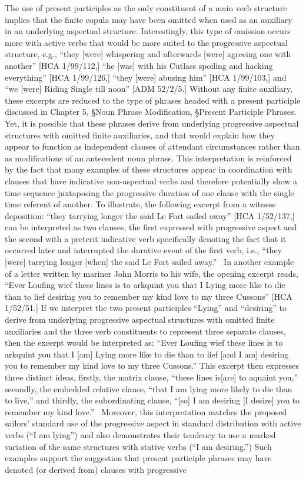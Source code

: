 \documentclass[12pt]{article}
\newenvironment{styleStandard}{\renewcommand\baselinestretch{1.0}\setlength\leftskip{0cm}\setlength\rightskip{0cm plus 1fil}\setlength\parindent{0cm}\setlength\parfillskip{0pt plus 1fil}\setlength\parskip{0in plus 1pt}\writerlistparindent\writerlistleftskip\leavevmode\normalfont\normalsize\writerlistlabel\ignorespaces}{\unskip\vspace{0in plus 1pt}\par}
\newcommand\writerlistleftskip{}
\newcommand\writerlistparindent{}
\newcommand\writerlistlabel{}
\begin{document}
\begin{styleStandard}
The use of present participles as the only constituent of a main verb structure implies that the finite copula may have been omitted when used as an auxiliary in an underlying aspectual structure. Interestingly, this type of omission occurs more with active verbs that would be more suited to the progressive aspectual structure, e.g., “they [were] whispering and afterwards [were] agreeing one with another” [HCA 1/99/112,] “he [was] with his Cutlass spoiling and hacking everything” [HCA 1/99/126,] “they [were] abusing him” [HCA 1/99/103,] and “we [were] Riding Single till noon” [ADM 52/2/5.] Without any finite auxiliary, these excerpts are reduced to the type of phrases headed with a present participle discussed in Chapter 5, §Noun Phrase Modification, §Present Participle Phrases. Yet, it is possible that these phrases derive from underlying progressive aspectual structures with omitted finite auxiliaries, and that would explain how they appear to function as independent clauses of attendant circumstances rather than as modifications of an antecedent noun phrase. This interpretation is reinforced by the fact that many examples of these structures appear in coordination with clauses that have indicative non-aspectual verbs and therefore potentially show a time sequence juxtaposing the progressive duration of one clause with the single time referent of another. To illustrate, the following excerpt from a witness deposition: “they tarrying longer the said Le Fort sailed away” [HCA 1/52/137,] can be interpreted as two clauses, the first expressed with progressive aspect and the second with a preterit indicative verb specifically denoting the fact that it occurred later and interrupted the durative event of the first verb, i.e., “they [were] tarrying longer [when] the said Le Fort sailed away.” \ In another example of a letter written by mariner John Morris to his wife, the opening excerpt reads, “Ever Loufing wief these lines is to arkquint you that I Lying more like to die than to lief desiring you to remember my kind love to my three Cussons” [HCA 1/52/51.] If we interpret the two present participles “Lying” and “desiring” to derive from underlying progressive aspectual structures with omitted finite auxiliaries and the three verb constituents to represent three separate clauses, then the excerpt would be interpreted as: “Ever Loufing wief these lines is to arkquint you that I [am] Lying more like to die than to lief [and I am] desiring you to remember my kind love to my three Cussons.” This excerpt then expresses three distinct ideas, firstly, the matrix clause, “these lines is[are] to aquaint you,” secondly, the embedded relative clause, “that I am lying more likely to die than to live,” and thirdly, the subordinating clause, “[so] I am desiring [I desire] you to remember my kind love.” \ Moreover, this interpretation matches the proposed sailors’ standard use of the progressive aspect in standard distribution with active verbs (“I am lying”) and also demonstrates their tendency to use a marked variation of the same structures with stative verbs (“I am desiring.”) Such examples support the suggestion that present participle phrases may have denoted (or derived from) clauses with progressive 
\end{styleStandard}
\end{document}
